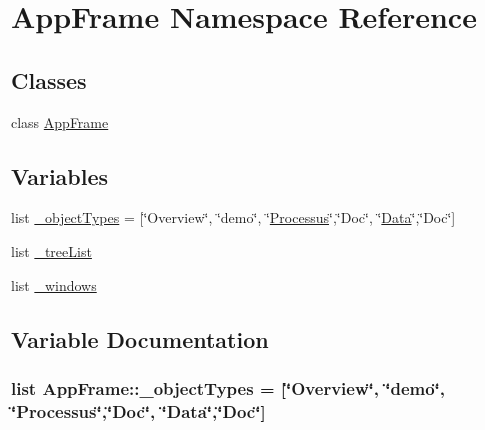 \hypertarget{namespaceAppFrame}{
\section{AppFrame Namespace Reference}
\label{namespaceAppFrame}
}
\subsection*{Classes}
\begin{DoxyCompactItemize}
\item 
class \hyperlink{classAppFrame_1_1AppFrame}{AppFrame}
\end{DoxyCompactItemize}
\subsection*{Variables}
\begin{DoxyCompactItemize}
\item 
list \hyperlink{namespaceAppFrame_aec9ef772bd7a8a963385ddcc6234b85f}{\_\-objectTypes} = \mbox{[}\char`\"{}Overview\char`\"{}, \char`\"{}demo\char`\"{}, \char`\"{}\hyperlink{classProcessus}{Processus}\char`\"{},\char`\"{}Doc\char`\"{}, \char`\"{}\hyperlink{classData}{Data}\char`\"{},\char`\"{}Doc\char`\"{}\mbox{]}
\item 
list \hyperlink{namespaceAppFrame_a3b7bebaeef2542cd239ab8792c383770}{\_\-treeList}
\item 
list \hyperlink{namespaceAppFrame_a0e529303fab3d8cdf9ba8bee04b01fe3}{\_\-windows}
\end{DoxyCompactItemize}


\subsection{Variable Documentation}
\hypertarget{namespaceAppFrame_aec9ef772bd7a8a963385ddcc6234b85f}{
\subsubsection[{\_\-objectTypes}]{\setlength{\rightskip}{0pt plus 5cm}list {\bf AppFrame::\_\-objectTypes} = \mbox{[}\char`\"{}Overview\char`\"{}, \char`\"{}demo\char`\"{}, \char`\"{}{\bf Processus}\char`\"{},\char`\"{}Doc\char`\"{}, \char`\"{}{\bf Data}\char`\"{},\char`\"{}Doc\char`\"{}\mbox{]}}}
\label{namespaceAppFrame_aec9ef772bd7a8a963385ddcc6234b85f}


